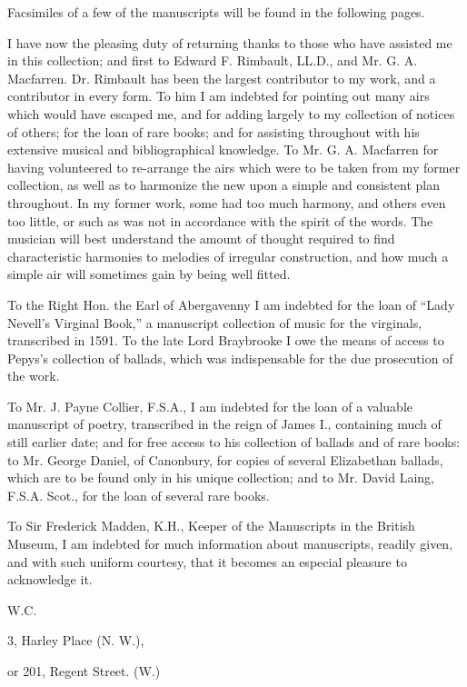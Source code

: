 Facsimiles of a few of the manuscripts will be found in the following pages.

I have now the pleasing duty of returning thanks to those who have assisted
me in this collection; and first to Edward F. Rimbault, LL.D., and Mr. G. A.
Macfarren. Dr. Rimbault has been the largest contributor to my work, and a
contributor in every form. To him I am indebted for pointing out many airs
which would have escaped me, and for adding largely to my collection of notices
of others; for the loan of rare books; and for assisting throughout with his extensive
musical and bibliographical knowledge. To Mr. G. A. Macfarren for 
having volunteered to re-arrange the
\pagebreak
airs which were to be taken from my former
collection, as well as to harmonize the new upon a simple and consistent plan 
throughout. In my former work, some had too much harmony, and others even
too little, or such as was not in accordance with the spirit of the words. The
musician will best understand the amount of thought required to find characteristic
harmonies to melodies of irregular construction, and how much a simple air
will sometimes gain by being well fitted.

To the Right Hon. the Earl of Abergavenny I am indebted for the loan of
“Lady Nevell’s Virginal Book,” a manuscript collection of music for the virginals,
transcribed in 1591. To the late Lord Braybrooke I owe the means of
access to Pepys’s collection of ballads, which was indispensable for the due
prosecution of the work.

To Mr. J. Payne Collier, F.S.A., I am indebted for the loan of a valuable
manuscript of poetry, transcribed in the reign of James I., containing much of
still earlier date; and for free access to his collection of ballads and of rare books:
to Mr. George Daniel, of Canonbury, for copies of several Elizabethan ballads,
which are to be found only in his unique collection; and to Mr. David Laing,
F.S.A. Scot., for the loan of several rare books.

To Sir Frederick Madden, K.H., Keeper of the Manuscripts in the British
Museum, I am indebted for much information about manuscripts, readily given,
and with such uniform courtesy, that it becomes an especial pleasure to
acknowledge it.

\medskip
\hfill W.C.\hspace*{4em}
\medskip

3, Harley Place (N. W.),

or 201, Regent Street. (W.)
\pagebreak
